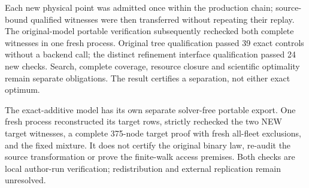 Each new physical point was admitted once within the production chain;
source-bound qualified witnesses were then transferred without repeating
their replay. The original-model portable verification subsequently rechecked
both complete witnesses in one fresh process. Original tree qualification
passed 39 exact controls without a backend call; the distinct refinement
interface qualification passed 24 new checks. Search, complete coverage,
resource closure and scientific optimality remain separate obligations.
The result certifies a separation, not either exact optimum.

The exact-additive model has its own separate solver-free portable export.
One fresh process reconstructed its target rows, strictly rechecked the two
NEW target witnesses, a complete 375-node target proof with fresh all-fleet
exclusions, and the fixed mixture. It does not certify the original binary
law, re-audit the source transformation or prove the finite-walk access
premises. Both checks are local author-run verification; redistribution and
external replication remain unresolved.

